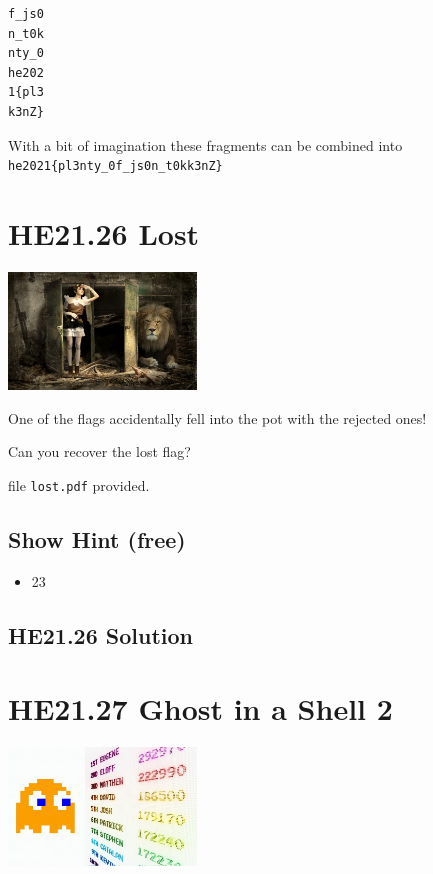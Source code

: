 \documentclass[english,a4paper,nols,noindent]{tufte-handout}
\begin{document}
\begin{verbatim}
f_js0
n_t0k
nty_0
he202
1{pl3
k3nZ}
\end{verbatim}

With a bit of imagination these fragments can be combined into
\verb+he2021{pl3nty_0f_js0n_t0kk3nZ}+

\hypertarget{he21.26}{%
  \section{HE21.26 Lost}
  \label{he21.26}}
\begin{marginfigure}
    \includegraphics[width=50mm]{images/challenge26.jpg}
\end{marginfigure}

\noindent One of the flags accidentally fell into the pot with the rejected ones!

Can you recover the lost flag?

file \verb+lost.pdf+ provided.

\subsection{Show Hint (free)}
\begin{itemize}
\item 23
\end{itemize}

\hypertarget{he21.26-solution}{%
\subsection{HE21.26 Solution}\label{he21.26-solution}}

\noindent 



\hypertarget{he21.27}{%
  \section{HE21.27 Ghost in a Shell 2}
  \label{he21.27}}
\begin{marginfigure}
    \includegraphics[width=50mm]{images/challenge27.jpg}
\end{marginfigure}
\end{document}
